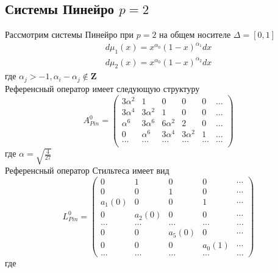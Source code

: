 \documentclass{report}
\begin{document}
\subsection{Системы Пинейро $p=2$}
Рассмотрим системы Пинейро при $p=2$ на общем носителе $\Delta=[0,1]$ 
$$
\begin{array}{llll}
d\mu_1(x)=x^{\alpha_0}(1-x)^{\alpha_1}dx \\
d\mu_2(x)=x^{\alpha_0}(1-x)^{\alpha_2}dx
\end{array}
$$
где $\alpha_j>-1, \alpha_i-\alpha_j \not \in \textbf {Z} $ \\
Референсный оператор имеет следующую структуру
$$
A^0_{Pin}=
\left(
\begin{array}{cccccccc}
3\alpha^2 & 1 & 0 & 0 & 0 & \ldots \\
3\alpha^4 & 3\alpha^2 & 1 & 0 & 0 & \ldots \\
\alpha^6 & 3\alpha^6 & 6\alpha^2 & 2 & 0 & \ldots \\
0 & \alpha^6 & 3\alpha^4 & 3\alpha^2 & 1 & \ldots \\
\ldots & \ldots & \ldots & \ldots & \ldots & \ldots \\
\end{array}
\right)
$$
где $\alpha=\displaystyle\sqrt{\frac{4}{27}}$ \\
Референсный оператор Стильтеса имеет вид
$$
L^0_{Pin} = \left(\begin{array}{cccccccccccc}
0 & 1 & 0 & 0 &  \cdots \\
0 & 0 & 1 & 0 &  \cdots \\
a_1(0) & 0 & 0 & 1 &  \cdots \\
0 & a_2(0) & 0 & 0 &  \cdots \\
\ldots & \ldots & \ldots & \ldots & \ldots \\
0 & 0 & a_5(0) & 0 &  \cdots \\
0 & 0 & 0 & a_0(1) &  \cdots \\
\ldots & \ldots & \ldots & \ldots & \ldots
\end{array}\right)
$$ 
где
\end{document}
